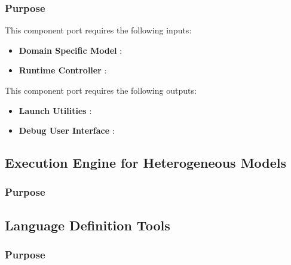 \documentclass{gemoc} %
\begin{document}

\subsubsection{Purpose}

This component port requires the following inputs:
\begin{itemize}
  \item \textbf{Domain Specific Model} :
  \item \textbf{Runtime Controller} :
\end{itemize}

This component port requires the following outputs:
\begin{itemize}
  \item \textbf{Launch Utilities} :
  \item \textbf{Debug User Interface} :
\end{itemize}

\subsection{Execution Engine for Heterogeneous Models}


\subsubsection{Purpose}



\subsection{Language Definition Tools}


\subsubsection{Purpose}
\end{document}
